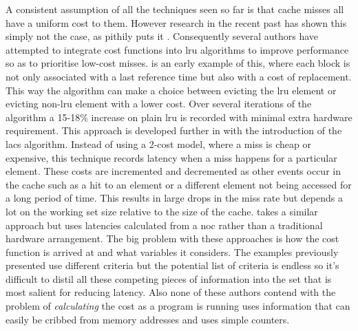 A consistent assumption of all the techniques seen so far is that cache misses all have a uniform cost to them. However research in the recent past has shown this simply not the case, as \citet{qureshiCaseMLPAwareCache2006} pithily puts it . Consequently several authors have attempted to integrate cost functions into \gls{lru} algorithms to improve performance so as to prioritise low-cost misses. \citet{jeongCostsensitiveCacheReplacement2003} is an early example of this, where each block is not only associated with a last reference time but also with a cost of replacement. This way the algorithm can make a choice between evicting the \gls{lru} element or evicting non-\gls{lru} element with a lower cost. Over several iterations of the algorithm a 15-18\% increase on plain \gls{lru} is recorded with minimal extra hardware requirement. This approach is developed further in \citet{kharbutliLACSLocalityAwareCostSensitive2014a} with the introduction of the \gls{lacs} algorithm. Instead of using a 2-cost model, where a miss is cheap or expensive, this technique records latency when a miss happens for a particular element. These costs are incremented and decremented as other events occur in the cache such as a hit to an element or a different element not being accessed for a long period of time. This results in large drops in the miss rate but depends a lot on the working set size relative to the size of the cache. \citet{dasLatencyAwareBlock2017} takes a similar approach but uses latencies calculated from a \gls{noc} rather than a traditional hardware arrangement. The big problem with these approaches is how the cost function is arrived at and what variables it considers. The examples previously presented use different criteria but the potential list of criteria is endless so it's difficult to distil all these competing pieces of information into the set that is most salient for reducing latency. Also none of these authors contend with the problem of \emph{calculating} the cost as a program is running \citet{jeongCostsensitiveCacheReplacement2003} uses information that can easily be cribbed from memory addresses and \citet{kharbutliLACSLocalityAwareCostSensitive2014a} uses simple counters.

